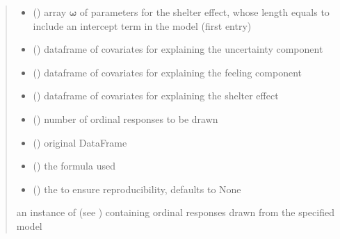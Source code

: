 \documentclass[letterpaper,10pt,english]{sphinxmanual}
\begin{document}
\begin{fulllineitems}
\begin{quote}
\begin{description}
\begin{itemize}
\item {} 
\sphinxAtStartPar
{} () \textendash{} array \(\pmb \omega\) of parameters for the shelter effect, whose length equals 
 to include an intercept term in the model (first entry)

\item {} 
\sphinxAtStartPar
{} () \textendash{} dataframe of covariates for explaining the uncertainty component

\item {} 
\sphinxAtStartPar
{} () \textendash{} dataframe of covariates for explaining the feeling component

\item {} 
\sphinxAtStartPar
{} () \textendash{} dataframe of covariates for explaining the shelter effect

\item {} 
\sphinxAtStartPar
{} () \textendash{} number of ordinal responses to be drawn

\item {} 
\sphinxAtStartPar
{} () \textendash{} original DataFrame

\item {} 
\sphinxAtStartPar
{} () \textendash{} the formula used

\item {} 
\sphinxAtStartPar
{} (\sphinxstyleliteralemphasis{\sphinxupquote{, }}) \textendash{} the  to ensure reproducibility, defaults to None

\end{itemize}

\sphinxAtStartPar
an instance of  (see ) containing ordinal responses drawn from the specified model

\end{description}\end{quote}

\end{fulllineitems}
\end{document}
